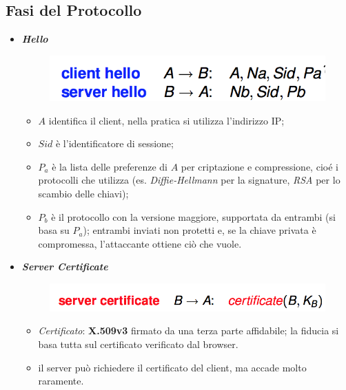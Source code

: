 \documentclass[11pt, a4paper, twoside, italian]{report}
\theoremstyle{plain}
\begin{document}
\subsection*{Fasi del Protocollo}
\begin{multicols}{2}
\begin{itemize}
	\item \textit{\textbf{Hello}}
	\begin{figure}[H]
		\centering
		\includegraphics[scale=0.6]{sslhello}
	\end{figure}
	\begin{itemize}
		\item $A$ identifica il client, nella pratica si utilizza l'indirizzo IP;
		\item $Sid$ è l'identificatore di sessione;
		\item $P_{a}$ è la lista delle preferenze di $A$ per criptazione e compressione, cioé i protocolli che utilizza (es. \textit{Diffie-Hellmann} per la signature, \textit{RSA} per lo scambio delle chiavi);
		\item $P_{b}$ è il protocollo con la versione maggiore, supportata da entrambi (si basa su $P_{a}$); entrambi inviati non protetti e, se la chiave privata è compromessa, l'attaccante ottiene ciò che vuole.
	\end{itemize}
\end{itemize}
\columnbreak
\begin{itemize}
	\item \textit{\textbf{Server Certificate}}
	\begin{figure}[H]
		\centering
		\includegraphics[scale=0.6]{sslservercertificate}
	\end{figure}
\begin{itemize}
	\item \textit{Certificato}: \textbf{X.509v3} firmato da una terza parte affidabile; la fiducia si basa tutta sul certificato verificato dal browser.
	\item il server può richiedere il certificato del client, ma accade molto raramente.
\end{itemize}
\end{itemize}
\end{multicols}
\end{document}

